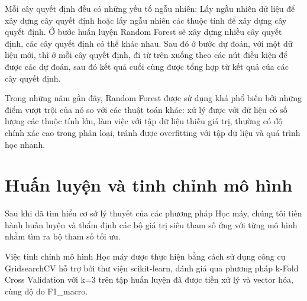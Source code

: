 \documentclass[12pt,a4paper,oneside]{book}
\begin{document}
		Mỗi cây quyết định đều có những yếu tố ngẫu nhiên: Lấy ngẫu nhiên dữ liệu để xây dựng cây quyết định hoặc lấy ngẫu nhiên các thuộc tính để xây dựng cây quyết định.
		Ở bước huấn luyện Random Forest sẽ xây dựng nhiều cây quyết định, các cây quyết định có thể khác nhau. Sau đó ở bước dự đoán, với một dữ liệu mới, thì ở mỗi cây quyết định, đi từ trên xuống theo các nút điều kiện để được các dự đoán, sau đó kết quả cuối cùng được tổng hợp từ kết quả của các cây quyết định.
		
		Trong những năm gần đây, Random Forest được sử dụng khá phổ biến bởi những điểm vượt trội của nó so với các thuật toán khác: xử lý được với dữ liệu có số lượng các thuộc tính lớn, làm việc với tập dữ liệu thiếu giá trị, thường có độ chính xác cao trong phân loại, tránh được overfitting với tập dữ liệu và quá trình học nhanh.
		
	\section{Huấn luyện và tinh chỉnh mô hình}
		Sau khi đã tìm hiểu cơ sở lý thuyết của các phương pháp Học máy, chúng tôi tiến hành huấn luyện và thẩm định các bộ giá trị siêu tham số ứng với từng mô hình nhằm tìm ra bộ tham số tối ưu.
				
		Việc tinh chỉnh mô hình Học máy được thực hiện bằng cách sử dụng công cụ GridsearchCV hỗ trợ bởi thư viện scikit-learn, đánh giá qua phương pháp k-Fold Cross Validation với k=3 trên tập huấn luyện đã được tiền xử lý và vector hóa, cùng độ đo F1\_macro.
	
\end{document}
